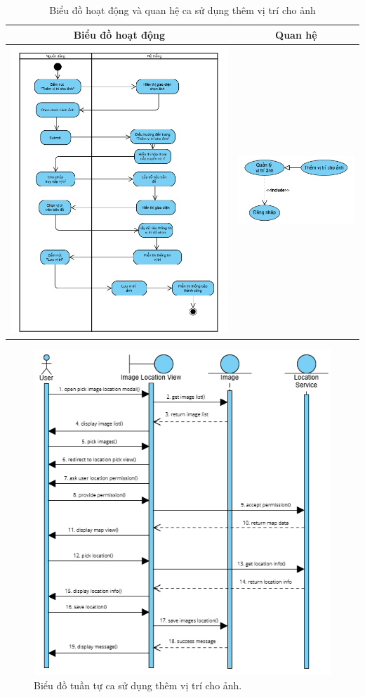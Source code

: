 \noindent 
\begin{table}[H]
\centering
\caption{Biểu đồ hoạt động và quan hệ ca sử dụng thêm vị trí cho ảnh}
\label{tab:add-location-usecase-activity}
\begin{tabular}{| c | c |}
    \hline
    \textbf{Biểu đồ hoạt động} & \textbf{Quan hệ} \\ 
    \hline
    \includegraphics[width=0.6\linewidth]{figures/c3/3-3-15-activity-diagram.png} 
    &  
    \includegraphics[width=0.35\linewidth]{figures/c3/3-3-15-relationship.png} \\ 
    \hline
\end{tabular}
\end{table}

\begin{figure}[H]
    \centering  
    \includegraphics[width=1.1\textwidth]{figures/c3/3-3-15-sequence-diagram.png}
    \caption{Biểu đồ tuần tự ca sử dụng thêm vị trí cho ảnh.}
    \label{fig:3-3-15-sequence-diagram}
\end{figure}
